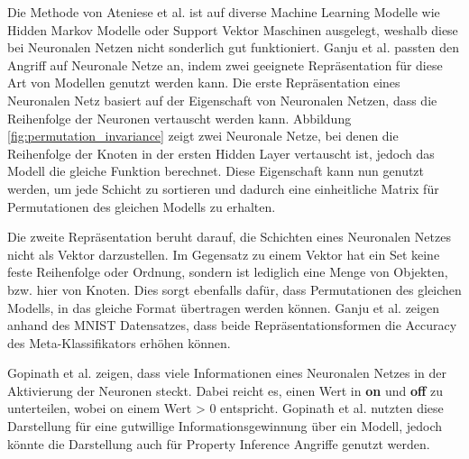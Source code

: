 Die Methode von Ateniese et al. \cite{P-80} ist auf diverse Machine Learning Modelle wie Hidden Markov Modelle oder Support Vektor Maschinen ausgelegt, weshalb diese bei Neuronalen Netzen nicht sonderlich gut funktioniert. 
Ganju et al. \cite{P-11} passten den Angriff auf Neuronale Netze an, indem zwei geeignete Repräsentation für diese Art von Modellen genutzt werden kann.
Die erste Repräsentation eines Neuronalen Netz basiert auf der Eigenschaft von Neuronalen Netzen, dass die Reihenfolge der Neuronen vertauscht werden kann. 
Abbildung \ref{fig:permutation_invariance} zeigt zwei Neuronale Netze, bei denen die Reihenfolge der Knoten in der ersten Hidden Layer vertauscht ist, jedoch das Modell die gleiche Funktion berechnet.
Diese Eigenschaft kann nun genutzt werden, um jede Schicht zu sortieren und dadurch eine einheitliche Matrix für Permutationen des gleichen Modells zu erhalten.

Die zweite Repräsentation beruht darauf, die Schichten eines Neuronalen Netzes nicht als Vektor darzustellen.
Im Gegensatz zu einem Vektor hat ein Set keine feste Reihenfolge oder Ordnung, sondern ist lediglich eine Menge von Objekten, bzw. hier von Knoten.
Dies sorgt ebenfalls dafür, dass Permutationen des gleichen Modells, in das gleiche Format übertragen werden können.
Ganju et al. \cite{P-11} zeigen anhand des MNIST Datensatzes\cite{D-MNIST}, dass beide Repräsentationsformen die Accuracy des Meta-Klassifikators erhöhen können.

Gopinath et al. \cite{P-12} zeigen, dass viele Informationen eines Neuronalen Netzes in der Aktivierung der Neuronen steckt. 
Dabei reicht es, einen Wert in \textbf{on} und \textbf{off} zu unterteilen, wobei on einem Wert > 0 entspricht. 
Gopinath et al. \cite{P-12} nutzten diese Darstellung für eine gutwillige Informationsgewinnung über ein Modell, jedoch könnte die Darstellung auch für Property Inference Angriffe genutzt werden.